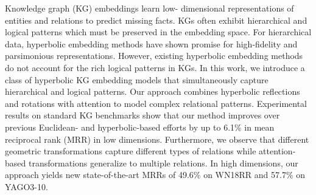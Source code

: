 Knowledge graph (KG) embeddings learn low- dimensional representations of entities and relations to predict missing facts. KGs often exhibit hierarchical and logical patterns which must be preserved in the embedding space. For hierarchical data, hyperbolic embedding methods have shown promise for high-fidelity and parsimonious representations. However, existing hyperbolic embedding methods do not account for the rich logical patterns in KGs. In this work, we introduce a class of hyperbolic KG embedding models that simultaneously capture hierarchical and logical patterns. Our approach combines hyperbolic reflections and rotations with attention to model complex relational patterns. Experimental results on standard KG benchmarks show that our method improves over previous Euclidean- and hyperbolic-based efforts by up to 6.1\% in mean reciprocal rank (MRR) in low dimensions. Furthermore, we observe that different geometric transformations capture different types of relations while attention- based transformations generalize to multiple relations. In high dimensions, our approach yields new state-of-the-art MRRs of 49.6\% on WN18RR and 57.7\% on YAGO3-10.
